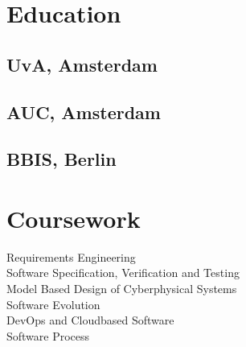 \documentclass[letterpaper]{deedy-resume} %
\begin{document}
\begin{minipage}[t]{0.33\textwidth} %


\section{Education} 

\subsection{UvA, Amsterdam}

\sectionspace %

\subsection{AUC, Amsterdam}

\sectionspace %

\sectionspace %


\subsection{BBIS, Berlin}

\sectionspace %


\sectionspace %


\section{Coursework}
Requirements Engineering \\
Software Specification, Verification and Testing\\
Model Based Design of Cyber\-physical Systems \\
Software Evolution\\
DevOps and Cloud\-based Software\\
Software Process\\


\end{minipage}
\end{document}
